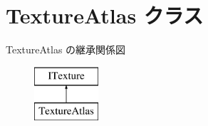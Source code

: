 \hypertarget{class_a_p_i_1_1_texture_atlas}{}\section{Texture\+Atlas クラス}
\label{class_a_p_i_1_1_texture_atlas}
Texture\+Atlas の継承関係図\begin{figure}[H]
\begin{center}
\leavevmode
\includegraphics[height=2.000000cm]{class_a_p_i_1_1_texture_atlas}
\end{center}
\end{figure}
